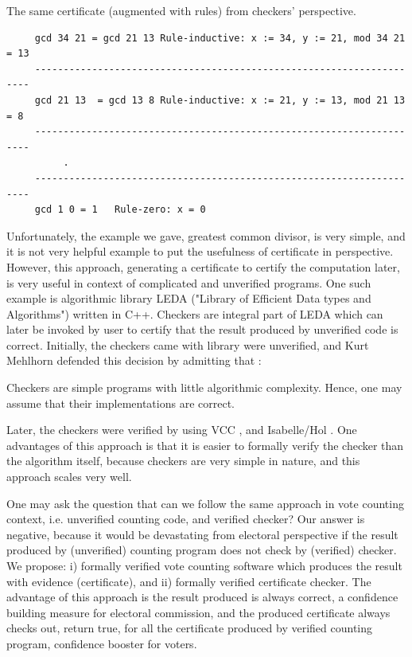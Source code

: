  \noindent	
  The same certificate (augmented with rules) from checkers'  perspective.
    \begin{verbatim}
     gcd 34 21 = gcd 21 13 Rule-inductive: x := 34, y := 21, mod 34 21 = 13
     ---------------------------------------------------------------------
     gcd 21 13  = gcd 13 8 Rule-inductive: x := 21, y := 13, mod 21 13 = 8
     ---------------------------------------------------------------------
          .
     ---------------------------------------------------------------------
     gcd 1 0 = 1   Rule-zero: x = 0 
   \end{verbatim}
   
   
   Unfortunately, the example we gave,  greatest common divisor, is very simple, and 
   it is not 
   very helpful example to put the usefulness of certificate in perspective.
   However, this approach, generating a certificate to certify the computation later, is very useful in context 
   of complicated and unverified  programs.   One such example is algorithmic library  
   LEDA \citep{Mehlhorn:1995:LPC:204865.204889} ("Library of Efficient Data types and Algorithms") 
   written in C++.  Checkers are integral part of LEDA 
   which can later be invoked by user to certify that the result produced by unverified 
   code is correct. 
   Initially, the checkers came with library were unverified, and 
   Kurt Mehlhorn defended this decision by admitting that \citep{Alkassar2014}: 
   \begin{displayquote}
   Checkers are simple programs with little algorithmic 
   complexity. Hence, one may assume that their implementations are correct.
	\end{displayquote}   
	\noindent
    Later, the 
   checkers \citep{Alkassar2014} were verified by using VCC \citep{10.1007/978-3-642-03359-9_2}, 
   and Isabelle/Hol \citep{Nipkow:2002:IPA:1791547}.  One advantages of this approach is 
   that it is easier to formally verify the checker than the algorithm itself, because 
   checkers are very simple in nature, and this approach scales very well. 
   
   One may ask the question that can we follow the same approach in vote counting context,
   i.e. unverified counting code, and verified checker?  Our answer is negative, because 
   it would be devastating from electoral perspective if 
   the result produced by (unverified) counting program does not 
   check by (verified) checker. We propose: i) formally verified vote counting
   software which produces the result with evidence (certificate), and ii) formally verified 
   certificate checker. The advantage of this approach is the result produced is always correct, 
   a confidence building measure for electoral commission, and the produced certificate always checks out, 
   return true, for all the certificate produced by verified counting program, confidence booster for 
   voters. 
     
